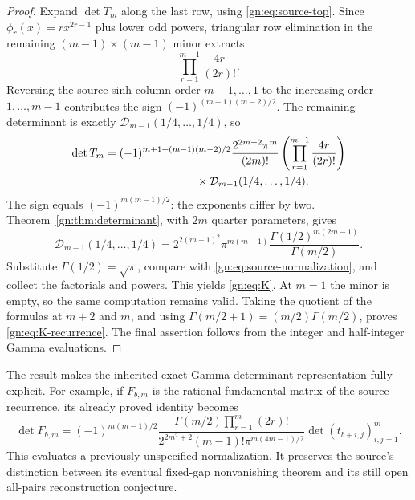 \documentclass[11pt,a4paper]{article}
\numberwithin{equation}{section}
\theoremstyle{definition}
\theoremstyle{remark}
\begin{document}
\begin{proof}
Expand $\det T_m$ along the last row, using
\eqref{gn:eq:source-top}.  Since
$\phi_r(x)=rx^{2r-1}$ plus lower odd powers, triangular row elimination
in the remaining $(m-1)\times(m-1)$ minor extracts
\[
                  \prod_{r=1}^{m-1}\frac{4r}{(2r)!}.
\]
Reversing the source sinh-column order $m-1,\ldots,1$ to the increasing
order $1,\ldots,m-1$ contributes the sign
$(-1)^{(m-1)(m-2)/2}$.  The remaining determinant is exactly
$\mathcal D_{m-1}(1/4,\ldots,1/4)$, so
\begin{equation}\label{gn:eq:detT-factorization}
\begin{split}
 \det T_m={}&(-1)^{m+1+(m-1)(m-2)/2}
 \frac{2^{2m+2}\pi^m}{(2m)!}
   \left(\prod_{r=1}^{m-1}\frac{4r}{(2r)!}\right)\\
 &\hspace{24mm}\times\mathcal D_{m-1}(1/4,\ldots,1/4).
\end{split}
\end{equation}
The sign equals $(-1)^{m(m-1)/2}$: the exponents differ by two.
Theorem~\ref{gn:thm:determinant}, with $2m$ quarter parameters, gives
\begin{equation}\label{gn:eq:quarter-minor}
 \mathcal D_{m-1}(1/4,\ldots,1/4)
 =2^{2(m-1)^2}\pi^{m(m-1)}
       \frac{\Gamma(1/2)^{m(2m-1)}}{\Gamma(m/2)}.
\end{equation}
Substitute $\Gamma(1/2)=\sqrt\pi$, compare with
\eqref{gn:eq:source-normalization}, and collect the factorials and
powers.  This yields \eqref{gn:eq:K}.  At $m=1$ the minor is empty,
so the same computation remains valid.  Taking the quotient of the
formulas at $m+2$ and $m$, and using
$\Gamma(m/2+1)=(m/2)\Gamma(m/2)$, proves
\eqref{gn:eq:K-recurrence}.  The final assertion follows from the
integer and half-integer Gamma evaluations.
\end{proof}

The result makes the inherited exact Gamma determinant representation
fully explicit.  For example, if $F_{b,m}$ is the rational fundamental
matrix of the source recurrence, its already proved identity becomes
\begin{equation}\label{gn:eq:F-explicit}
 \det F_{b,m}
 =(-1)^{m(m-1)/2}
   \frac{\Gamma(m/2)\prod_{r=1}^m(2r)!}
        {2^{2m^2+2}(m-1)!\pi^{m(4m-1)/2}}
       \det(t_{b+i,j})_{i,j=1}^m.
\end{equation}
This evaluates a previously unspecified normalization.  It preserves
the source's distinction between its eventual fixed-gap nonvanishing
theorem and its still open all-pairs reconstruction conjecture.
\end{document}
